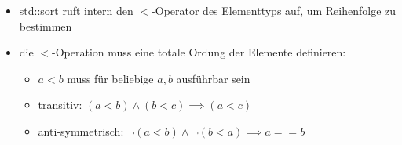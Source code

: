 \documentclass[a4paper]{scrartcl}
\theoremstyle{definition}
\theoremstyle{plain}
\theoremstyle{remark}
\theoremstyle{remark}
\begin{document}
\begin{itemize}
\begin{itemize}
\begin{itemize}
\item std::sort ruft intern den $<$-Operator des Elementtyps auf, um Reihenfolge zu bestimmen
\item die $<$-Operation muss eine totale Ordung der Elemente definieren:
\begin{itemize}
\item $a < b$ muss für beliebige $a,b$ ausführbar sein
\item transitiv: $(a < b) \wedge (b < c) \implies (a < c)$
\item anti-symmetrisch: $\neg(a < b) \wedge \neg(b < a) \implies a == b$
\end{itemize}
\end{itemize}
\end{itemize}
\end{itemize}
\end{document}
